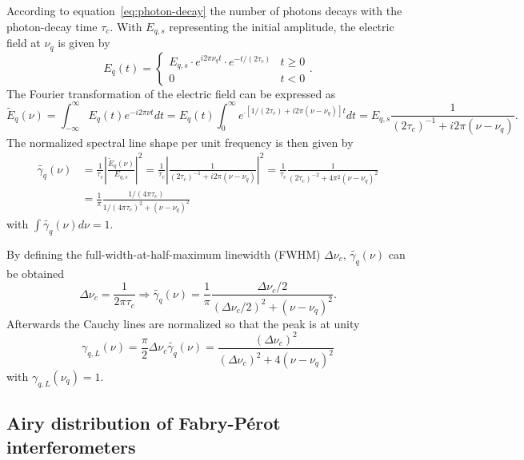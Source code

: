 According to equation~\eqref{eq:photon-decay} the number of photons decays with the photon-decay time $\tau_c$.
With $E_{q,s}$ representing the initial amplitude, the electric field at $\nu_q$ is given by
\begin{equation}
E_q(t) =
\begin{cases}
E_{q,s} \cdot e^{i2\pi\nu_qt} \cdot e^{-t/(2\tau_c)} &  t \geq 0 \\
0 &  t < 0
\end{cases}
.
\end{equation}
The Fourier transformation of the electric field can be expressed as
\begin{equation}
\tilde{E}_q(\nu) = \int_{-\infty}^\infty E_q(t)e^{-i2\pi\nu t}dt = E_q(t) \int_{0}^\infty e^{.[1/(2\tau_c)+i2\pi(\nu-\nu_q)]t}dt = E_{q,s} \frac{1}{(2\tau_c)^{-1}+i2\pi(\nu-\nu_q)}.
\end{equation}
The normalized spectral line shape per unit frequency is then given by
\begin{align}
\label{eq:round-trip-phase-shift}
\tilde{\gamma_q}(\nu)&=\frac{1}{\tau_c}\left|\frac{\tilde{E}_q(\nu)}{E_{q,s}}\right|^2=\frac{1}{\tau_c}\left|\frac{1}{(2\tau_c)^{-1}+i2\pi(\nu-\nu_q)}\right|^2 = \frac{1}{\tau_c}\frac{1}{(2\tau_c)^{-2}+4\pi^2(\nu-\nu_q)^2} \\
&=\frac{1}{\pi}\frac{1/(4\pi\tau_c)}{1/(4\pi\tau_c)^2+(\nu-\nu_q)^2}
\end{align}
with $\int \tilde{\gamma_q}(\nu)d\nu=1$.

By defining the full-width-at-half-maximum linewidth (FWHM) $\Delta\nu_c$, $\tilde{\gamma_q}(\nu)$ can be obtained
\begin{equation}
\Delta \nu_c = \frac{1}{2\pi\tau_c} \Rightarrow \tilde{\gamma_q}(\nu) = \frac{1}{\pi}\frac{\Delta \nu_c/2}{\left(\Delta\nu_c/2\right)^2+\left(\nu-\nu_q\right)^2}.
\end{equation}
Afterwards the Cauchy lines are normalized so that the peak is at unity
\begin{equation}
\label{eq:cauchy}
\gamma_{q,L}(\nu)=\frac{\pi}{2}\Delta\nu_c\tilde{\gamma_q}(\nu)=\frac{(\Delta\nu_c)^2}{\left(\Delta \nu_c\right)^2+4\left(\nu-\nu_q\right)^2}
\end{equation}
with $\gamma_{q,L}(\nu_q)=1$.
\subsection{Airy distribution of Fabry-Pérot interferometers}

